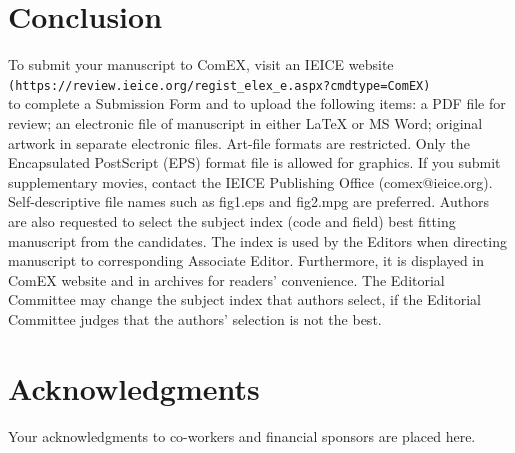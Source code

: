 \documentclass{comex}
\begin{document}
\section{Conclusion}

To submit your manuscript to ComEX, visit an IEICE website \\
\verb+(https://review.ieice.org/regist_elex_e.aspx?cmdtype=ComEX)+ \\
to complete a Submission Form and to upload the following items: a PDF
file for review; an electronic file of manuscript in either \LaTeX{} or
MS Word; original artwork in separate electronic files. 
Art-file formats are restricted. Only the Encapsulated PostScript
(EPS) format file is allowed for graphics. 
If you submit supplementary movies, contact the IEICE Publishing Office (comex@ieice.org). 
Self-descriptive file names such as fig1.eps and fig2.mpg are preferred.
Authors are also requested to
select the subject index (code and field) best fitting manuscript from
the candidates. The index is used by the Editors when
directing manuscript to corresponding Associate Editor. Furthermore, it
is displayed in ComEX website and in archives for readers'
convenience. The Editorial Committee may change the subject index that
authors select, if the Editorial Committee judges that the authors'
selection is not the best.

\section*{Acknowledgments}

Your acknowledgments to co-workers and financial sponsors are placed here.
\end{document}
